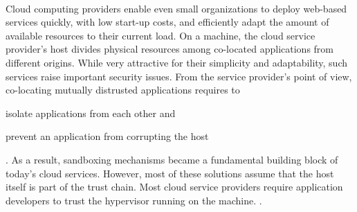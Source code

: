 %
%
%

\\

Cloud computing providers enable even small organizations to deploy web-based services quickly, with low start-up costs, and efficiently adapt the amount of available resources to their current load.
On a machine, the cloud service provider's host divides physical resources among co-located applications from different origins.
While very attractive for their simplicity and adaptability, such services raise important security issues.
From the service provider's point of view, co-locating mutually distrusted applications requires to
\begin{enumerate*}
	\item isolate applications from each other and
	\item prevent an application from corrupting the host
\end{enumerate*}.
As a result, sandboxing mechanisms became a fundamental building block of today's cloud services.
However, most of these solutions assume that the host itself is part of the trust chain.
Most cloud service providers require application developers to trust the hypervisor running on the machine.
.


